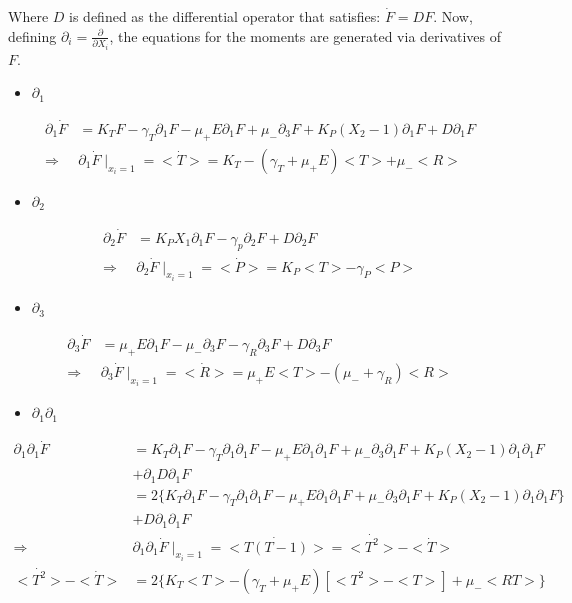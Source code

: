 \documentclass{article}
\begin{document}
Where $D$ is defined as the differential operator that satisfies: $\Dot{F} = DF$. Now, defining $\partial_i = \frac{\partial}{\partial X_i}$, the equations for the moments are generated via derivatives of $F$.

\begin{itemize}
    \item $\partial_1$
\end{itemize}
\begin{align*}
    \partial_1\Dot{F} &= K_TF - \gamma_T\partial_1F - \mu_+E\partial_1F + \mu_-\partial_3F + K_P(X_2-1)\partial_1F + D\partial_1F\\
    \Longrightarrow   & \partial_1\Dot{F}\mid_{x_i=1} = <\Dot{T}> = K_T - (\gamma_T + \mu_+E)<T> + \mu_-<R>
\end{align*}

\begin{itemize}
    \item $\partial_2$
\end{itemize}
\begin{align*}
    \partial_2\Dot{F} &= K_PX_1\partial_1F - \gamma_p\partial_2F + D\partial_2F\\
    \Longrightarrow   & \partial_2\Dot{F}\mid_{x_i=1} = <\Dot{P}> = K_P<T> - \gamma_P<P>
\end{align*}

\begin{itemize}
    \item $\partial_3$
\end{itemize}
\begin{align*}
    \partial_3\Dot{F} &= \mu_+E\partial_1F - \mu_-\partial_3F - \gamma_R\partial_3F + D\partial_3F\\
    \Longrightarrow   &  \partial_3\Dot{F}\mid_{x_i=1} = <\Dot{R}> = \mu_+E<T> - (\mu_- + \gamma_R)<R>
\end{align*}

\begin{itemize}
    \item $\partial_1\partial_1$
\end{itemize}
\begin{align*}
    \partial_1\partial_1\Dot{F} &= K_T\partial_1F - \gamma_T\partial_1\partial_1F - \mu_+E\partial_1\partial_1F + \mu_-\partial_3\partial_1F + K_P(X_2 - 1)\partial_1\partial_1F\\
                                &+ \partial_1D\partial_1F\\
                                &= 2\{K_T\partial_1F - \gamma_T\partial_1\partial_1F - \mu_+E\partial_1\partial_1F + \mu_-\partial_3\partial_1F + K_P(X_2 - 1)\partial_1\partial_1F\} \\
                                &+ D\partial_1\partial_1F\\
            \Longrightarrow     & \partial_1\partial_1\Dot{F}\mid_{x_i=1} = <\Dot{T(T-1)}> = <\Dot{T^2}> - <\Dot{T}>\\
    <\Dot{T^2}> - <\Dot{T}>     &= 2\{K_T<T> - (\gamma_T + \mu_+E)[<T^2> - <T>] + \mu_-<RT>\}
\end{align*}
\end{document}
